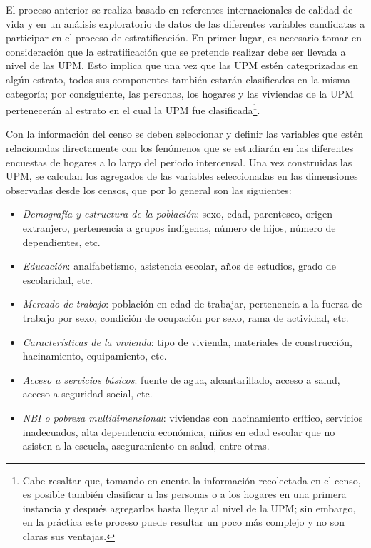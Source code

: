 \documentclass[
  10pt,
  spanish,
]{book}
\providecommand{\tightlist}{%
  \setlength{\itemsep}{0pt}\setlength{\parskip}{0pt}}
\begin{document}
El proceso anterior se realiza basado en referentes internacionales de calidad de vida y en un análisis exploratorio de datos de las diferentes variables candidatas a participar en el proceso de estratificación. En primer lugar, es necesario tomar en consideración que la estratificación que se pretende realizar debe ser llevada a nivel de las UPM. Esto implica que una vez que las UPM estén categorizadas en algún estrato, todos sus componentes también estarán clasificados en la misma categoría; por consiguiente, las personas, los hogares y las viviendas de la UPM pertenecerán al estrato en el cual la UPM fue clasificada\footnote{Cabe resaltar que, tomando en cuenta la información recolectada en el censo, es posible también clasificar a las personas o a los hogares en una primera instancia y después agregarlos hasta llegar al nivel de la UPM; sin embargo, en la práctica este proceso puede resultar un poco más complejo y no son claras sus ventajas.}.

Con la información del censo se deben seleccionar y definir las variables que estén relacionadas directamente con los fenómenos que se estudiarán en las diferentes encuestas de hogares a lo largo del periodo intercensal. Una vez construidas las UPM, se calculan los agregados de las variables seleccionadas en las dimensiones observadas desde los censos, que por lo general son las siguientes:

\begin{itemize}
\tightlist
\item
  \emph{Demografía y estructura de la población}: sexo, edad, parentesco, origen extranjero, pertenencia a grupos indígenas, número de hijos, número de dependientes, etc.
\item
  \emph{Educación}: analfabetismo, asistencia escolar, años de estudios, grado de escolaridad, etc.
\item
  \emph{Mercado de trabajo}: población en edad de trabajar, pertenencia a la fuerza de trabajo por sexo, condición de ocupación por sexo, rama de actividad, etc.
\item
  \emph{Características de la vivienda}: tipo de vivienda, materiales de construcción, hacinamiento, equipamiento, etc.
\item
  \emph{Acceso a servicios básicos}: fuente de agua, alcantarillado, acceso a salud, acceso a seguridad social, etc.
\item
  \emph{NBI o pobreza multidimensional}: viviendas con hacinamiento crítico, servicios inadecuados, alta dependencia económica, niños en edad escolar que no asisten a la escuela, aseguramiento en salud, entre otras.
\end{itemize}
\end{document}

